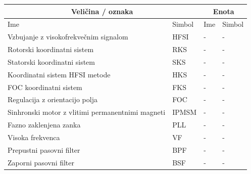 \documentclass[a4paper,twoside,openright,12pt,slovene]{book}
\begin{document}
\begin{center}
    \begin{tabular}{*{4}{l}} \hline
        \multicolumn{2}{c}{\bf{Veličina / oznaka}}           & \multicolumn{2}{c}{\bf{Enota}} \\ \hline
        Ime                                                        & Simbol                                 & Ime                  & Simbol                 \\ \hline
        Vzbujanje z visokofrekvečnim signalom                      & HFSI                                   & -                    & -                      \\
        Rotorski koordinatni sistem                                & RKS                                    & -                    & -                      \\
        Statorski koordinatni sistem                               & SKS                                    & -                    & -                      \\
        Koordinatni sistem HFSI metode                             & HKS                                    & -                    & -                      \\
        FOC koordinatni sistem                                     & FKS                                    & -                    & -                      \\
        Regulacija z orientacijo polja                             & FOC                                    & -                    & -                      \\
        Sinhronski motor z vlitimi permanentnimi magneti           & IPMSM                                  & -                    & -                      \\
        Fazno zaklenjena zanka                                     & PLL                                    & -                    & -                      \\
        Visoka frekvenca                                           & VF                                     & -                    & -                      \\
        Prepustni pasovni filter                                   & BPF                                    & -                    & -                      \\
        Zaporni pasovni filter                                     & BSF                                    & -                    & -                      \\

\end{tabular}
\end{center}
\end{document}
